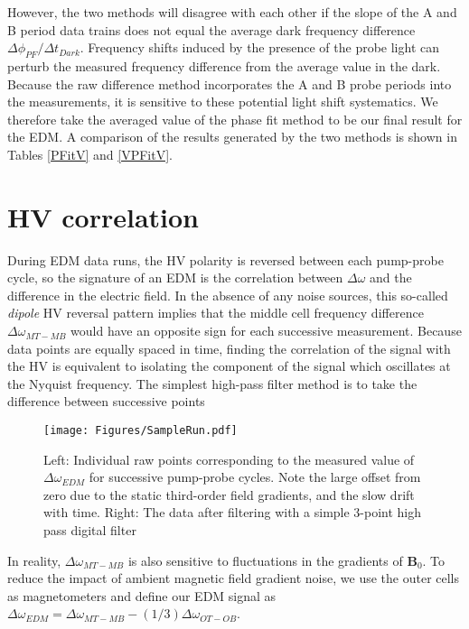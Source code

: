 \documentclass [10pt, twoside] {uwthesis}[2012/04/02]
\begin{document}
However, the two methods will disagree with each other if the slope of the A and B period data trains does not equal the average dark frequency difference $\Delta\phi_{PF}/\Delta t_{Dark}$. Frequency shifts induced by the presence of the probe light can perturb the measured frequency difference from the average value in the dark. Because the raw difference method incorporates the A and B probe periods into the measurements, it is sensitive to these potential light shift systematics. We therefore take the averaged value of the phase fit method to be our final result for the EDM. A comparison of the results generated by the two methods is shown in Tables \ref{PFitV} and \ref{VPFitV}. 


\section{HV correlation}
During EDM data runs, the HV polarity is reversed between each pump-probe cycle, so the signature of an EDM is the correlation between $\Delta \omega$ and the difference in the electric field. In the absence of any noise sources, this so-called \textit{dipole} HV reversal pattern implies that the middle cell frequency difference $\Delta \omega_{MT-MB}$ would have an opposite sign for each successive measurement. Because data points are equally spaced in time, finding the correlation of the signal with the HV is equivalent to isolating the component of the signal which oscillates at the Nyquist frequency. The simplest high-pass filter method is to take the difference between successive points

\begin{figure}
\begin{center}
\texttt{[image: Figures/SampleRun.pdf]}
\end{center}
\caption[EDM frequency difference $\Delta\omega_{EDM}$ raw data]%
{\narrower Left: Individual raw points corresponding to the measured value of $\Delta\omega_{EDM}$ for successive pump-probe cycles. Note the large offset from zero due to the static third-order field gradients, and the slow drift with time. Right: The data after filtering with a simple 3-point high pass digital filter}
\label{SampleRun}
\end{figure}

In reality, $\Delta \omega_{MT-MB}$ is also sensitive to fluctuations in the gradients of $\mathbf{B}_0$. To reduce the impact of ambient magnetic field gradient noise, we use the outer cells as magnetometers and define our EDM signal as $\Delta \omega_{EDM} = \Delta \omega_{MT-MB}- (1/3)\Delta \omega_{OT-OB}$.
\end{document}
